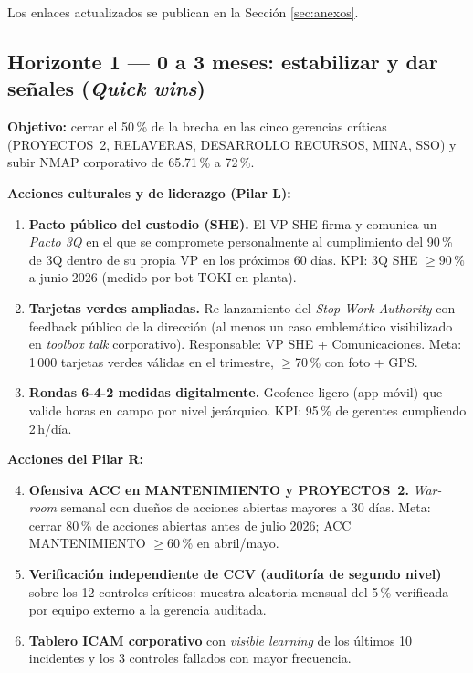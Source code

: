 \documentclass[12pt,a4paper]{article}
\begin{document}
Los enlaces actualizados se publican en la Sección \ref{sec:anexos}.

\subsection{Horizonte 1 --- 0 a 3 meses: estabilizar y dar señales (\emph{Quick wins})}

\begin{kbox}
\textbf{Objetivo:} cerrar el 50\,\% de la brecha en las cinco gerencias críticas (PROYECTOS~2, RELAVERAS, DESARROLLO RECURSOS, MINA, SSO) y subir NMAP corporativo de 65.71\,\% a 72\,\%.
\end{kbox}

\textbf{Acciones culturales y de liderazgo (Pilar L):}
\begin{enumerate}
\item \textbf{Pacto público del custodio (SHE).} El VP SHE firma y comunica un \emph{Pacto 3Q} en el que se compromete personalmente al cumplimiento del 90\,\% de 3Q dentro de su propia VP en los próximos 60 días. KPI: 3Q SHE $\geq 90\,\%$ a junio 2026 (medido por bot TOKI en planta).
\item \textbf{Tarjetas verdes ampliadas.} Re-lanzamiento del \emph{Stop Work Authority} con feedback público de la dirección (al menos un caso emblemático visibilizado en \emph{toolbox talk} corporativo). Responsable: VP SHE + Comunicaciones. Meta: 1\,000 tarjetas verdes válidas en el trimestre, $\geq$70\,\% con foto + GPS.
\item \textbf{Rondas 6-4-2 medidas digitalmente.} Geofence ligero (app móvil) que valide horas en campo por nivel jerárquico. KPI: 95\,\% de gerentes cumpliendo 2\,h/día.
\end{enumerate}

\textbf{Acciones del Pilar R:}
\begin{enumerate}\setcounter{enumi}{3}
\item \textbf{Ofensiva ACC en MANTENIMIENTO y PROYECTOS~2.} \emph{War-room} semanal con dueños de acciones abiertas mayores a 30 días. Meta: cerrar 80\,\% de acciones abiertas antes de julio 2026; ACC MANTENIMIENTO $\geq$60\,\% en abril/mayo.
\item \textbf{Verificación independiente de CCV (auditoría de segundo nivel)} sobre los 12 controles críticos: muestra aleatoria mensual del 5\,\% verificada por equipo externo a la gerencia auditada.
\item \textbf{Tablero ICAM corporativo} con \emph{visible learning} de los últimos 10 incidentes y los 3 controles fallados con mayor frecuencia.
\end{enumerate}
\end{document}
